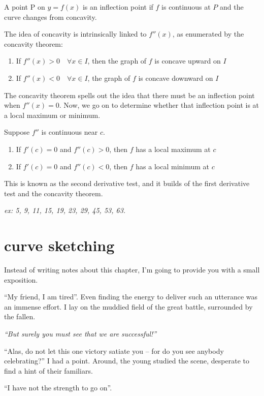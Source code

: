 \documentclass[10pt,a4paper]{report}
\begin{document}
A point P on $y = f(x)$ is an inflection point if $f$ is continuous at $P$ and the curve changes from concavity.

The idea of concavity is intrinsically linked to $f''(x)$, as enumerated by the concavity theorem:

\begin{enumerate}
	\item If $f''(x) > 0 \quad \forall x \in I$, then the graph of $f$ is concave upward on $I$
	\item If $f''(x) < 0 \quad \forall x \in I$, the graph of $f$ is concave downward on $I$
\end{enumerate}

The concavity theorem spells out the idea that there must be an inflection point when $f''(x) = 0$. Now, we go on to determine whether that inflection point is at a local maximum or minimum.

Suppose $f''$ is continuous near $c$.
\begin{enumerate}
	\item If $f'(c) = 0$ and $f''(c) > 0$, then $f$ has a local maximum at $c$
	\item If $f'(c) = 0$ and $f''(c) < 0$, then $f$ has a local minimum at $c$
\end{enumerate}

This is known as the second derivative test, and it builds of the first derivative test and the concavity theorem.

\emph{ex: 5, 9, 11, 15, 19, 23, 29, 45, 53, 63.}

\section{curve sketching}

Instead of writing notes about this chapter, I'm going to provide you with a small exposition.

``My friend, I am tired''. Even finding the energy to deliver such an utterance was an immense effort. I lay on the muddied field of the great battle, surrounded by the fallen.

\noindent \emph{``But surely you must see that we are successful!''}

``Alas, do not let this one victory satiate you -- for do you see anybody celebrating?'' I had a point. Around, the young studied the scene, desperate to find a hint of their familiars.

``I have not the strength to go on''.
\end{document}
